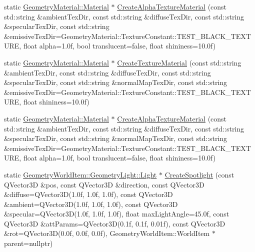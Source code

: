 \begin{DoxyCompactItemize}
\item 
static \mbox{\hyperlink{class_geometry_engine_1_1_geometry_material_1_1_material}{Geometry\+Material\+::\+Material}} $\ast$ \mbox{\hyperlink{class_geometry_engine_1_1_geometry_factory_a41814b5c1de6d781990e060037f3fc13}{Create\+Alpha\+Texture\+Material}} (const std\+::string \&ambient\+Tex\+Dir, const std\+::string \&diffuse\+Tex\+Dir, const std\+::string \&specular\+Tex\+Dir, const std\+::string \&emissive\+Tex\+Dir=Geometry\+Material\+::\+Texture\+Constant\+::\+T\+E\+S\+T\+\_\+\+B\+L\+A\+C\+K\+\_\+\+T\+E\+X\+T\+U\+RE, float alpha=1.\+0f, bool translucent=false, float shininess=10.\+0f)
\item 
static \mbox{\hyperlink{class_geometry_engine_1_1_geometry_material_1_1_material}{Geometry\+Material\+::\+Material}} $\ast$ \mbox{\hyperlink{class_geometry_engine_1_1_geometry_factory_a2bf6b7fbbb92985b920c470a0354c0cd}{Create\+Texture\+Material}} (const std\+::string \&ambient\+Tex\+Dir, const std\+::string \&diffuse\+Tex\+Dir, const std\+::string \&specular\+Tex\+Dir, const std\+::string \&normal\+Map\+Tex\+Dir, const std\+::string \&emissive\+Tex\+Dir=Geometry\+Material\+::\+Texture\+Constant\+::\+T\+E\+S\+T\+\_\+\+B\+L\+A\+C\+K\+\_\+\+T\+E\+X\+T\+U\+RE, float shininess=10.\+0f)
\item 
static \mbox{\hyperlink{class_geometry_engine_1_1_geometry_material_1_1_material}{Geometry\+Material\+::\+Material}} $\ast$ \mbox{\hyperlink{class_geometry_engine_1_1_geometry_factory_a7d1116b730798d68a9c03447750f402e}{Create\+Alpha\+Texture\+Material}} (const std\+::string \&ambient\+Tex\+Dir, const std\+::string \&diffuse\+Tex\+Dir, const std\+::string \&specular\+Tex\+Dir, const std\+::string \&normal\+Map\+Tex\+Dir, const std\+::string \&emissive\+Tex\+Dir=Geometry\+Material\+::\+Texture\+Constant\+::\+T\+E\+S\+T\+\_\+\+B\+L\+A\+C\+K\+\_\+\+T\+E\+X\+T\+U\+RE, float alpha=1.\+0f, bool translucent=false, float shininess=10.\+0f)
\item 
static \mbox{\hyperlink{class_geometry_engine_1_1_geometry_world_item_1_1_geometry_light_1_1_light}{Geometry\+World\+Item\+::\+Geometry\+Light\+::\+Light}} $\ast$ \mbox{\hyperlink{class_geometry_engine_1_1_geometry_factory_a166f4a7b9b070204650ab18a3cf1bf2b}{Create\+Spotlight}} (const Q\+Vector3D \&pos, const Q\+Vector3D \&direction, const Q\+Vector3D \&diffuse=Q\+Vector3D(1.\+0f, 1.\+0f, 1.\+0f), const Q\+Vector3\+D \&ambient=\+Q\+Vector3\+D(1.\+0f, 1.\+0f, 1.\+0f), const Q\+Vector3\+D \&specular=\+Q\+Vector3\+D(1.\+0f, 1.\+0f, 1.\+0f), float max\+Light\+Angle=45.\+0f, const Q\+Vector3\+D \&att\+Params=\+Q\+Vector3\+D(0.\+1f, 0.\+1f, 0.\+01f), const Q\+Vector3\+D \&rot=\+Q\+Vector3\+D(0.\+0f, 0.\+0f, 0.\+0f), Geometry\+World\+Item\+::\+World\+Item $\ast$parent=nullptr)

\end{DoxyCompactItemize}
